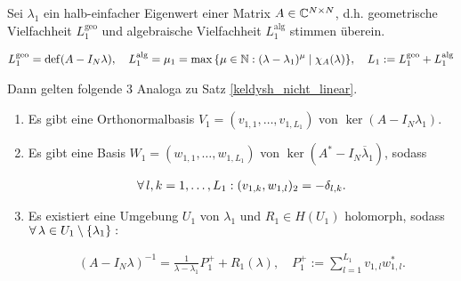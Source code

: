\begin{theorem} \label{keldysh_linear}
    
    Sei $\lambda_1$ ein halb-einfacher Eigenwert einer Matrix $A \in \mathbb{C}^{N \times N}$, d.h. geometrische Vielfachheit $L_1^\mathrm{geo}$ und algebraische Vielfachheit $L_1^\mathrm{alg}$ stimmen überein.

    \begin{align*}
        L_1^\mathrm{geo} = \operatorname{def}(A - I_N \lambda),
        \quad
        L_1^\mathrm{alg} = \mu_1 = \max {\left \{ \mu \in \mathbb{N}: (\lambda - \lambda_1)^\mu \mid \chi_A(\lambda) \right \}},
        \quad
        L_1 := L_1^\mathrm{geo} + L_1^\mathrm{alg}
    \end{align*}

    Dann gelten folgende $3$ Analoga zu Satz \ref{keldysh_nicht_linear}.

    \begin{enumerate}[label = (\roman*)]

        \item Es gibt eine Orthonormalbasis $V_1 = (v_{1, 1}, \dots, v_{1, L_1})$ von $\ker(A - I_N \lambda_1)$.

        \item Es gibt eine Basis $W_1 = (w_{1, 1}, \dots, w_{1, L_1})$ von $\ker(A^\ast - I_N \overline \lambda_1)$, sodass
        
        \begin{align*}
            \forall \, l, k = 1, \dots, L_1:
            (v_{1, k}, w_{1, l})_2 = -\delta_{l, k}.
        \end{align*}

        \item Es existiert eine Umgebung $U_1$ von $\lambda_1$ und $R_1 \in H(U_1)$ holomorph, sodass $\forall \, \lambda \in U_1 \setminus {\left \{ \lambda_1 \right \}}:$

        \begin{align*}
            (A - I_N \lambda)^{-1}
            =
            \frac{1}{\lambda - \lambda_1} P_1^+
            +
            R_1(\lambda),
            \quad
            P_1^+
            :=
            \sum_{l=1}^{L_1}
                v_{1, l} w_{1, l}^\ast.
        \end{align*}

    \end{enumerate}

\end{theorem}
